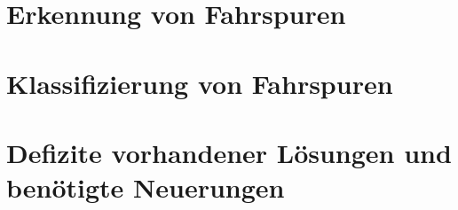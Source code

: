 





\section{Erkennung von Fahrspuren}
\label{sec:rw_lane_detection}






\section{Klassifizierung von Fahrspuren}
\label{sec:rw_lane_classification}

\section{Defizite vorhandener Lösungen und benötigte Neuerungen}
\label{sec:rw_deficites}